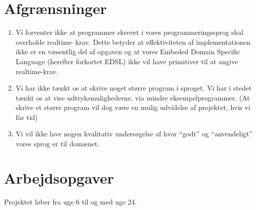 \documentclass[a4paper,oneside, draft]{memoir}
\newcommand{\EDSL}{Embeded Domain Specific Language (herefter forkortet
  EDSL) \renewcommand{\EDSL}{ EDSL }}
\begin{document}
\section{Afgrænsninger}
\begin{enumerate}
\item Vi forventer ikke at programmer skrevet i vores
  programmeringssprog skal overholde realtime--krav. Dette betyder at
  effektiviteten af implementationen ikke er en væsentlig del af
  opgaven og at vores \EDSL ikke vil have primitiver til at angive
  realtime-krav.
\item Vi har ikke tænkt os at skrive noget større program i sproget. Vi har
  i stedet tænkt os at vise udtryksmulighederne, via mindre eksempelprogrammer. (At
  skrive et større program vil dog være en mulig udvidelse af projektet, hvis vi
  får tid)
\item Vi vil ikke lave nogen kvalitativ undersøgelse af hvor "`godt"'
  og "`anvendeligt"' vores sprog er til domænet.
\end{enumerate}

\section{Arbejdsopgaver}
Projektet løber fra uge 6 til og med uge 24.
\end{document}
